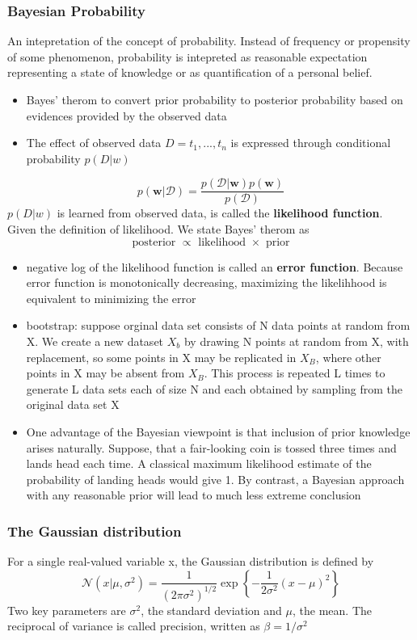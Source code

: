 \documentclass[11pt]{article}
\begin{document}
\subsubsection{Bayesian Probability}
\label{sec:org49c9b30}
An intepretation of the concept of probability. Instead of frequency or propensity of some phenomenon, probability is intepreted as reasonable expectation representing a state of knowledge or as quantification of a personal belief.     
\begin{itemize}
\item Bayes' therom to convert prior probability to posterior probability based on evidences provided by the observed data
\item The effect of observed data \(D = {t_1,..., t_n}\) is expressed through conditional probability \(p(D|w)\)
\end{itemize}
$$
p ( \mathbf { w } | \mathcal { D } ) = \frac { p ( \mathcal { D } | \mathbf { w } ) p ( \mathbf { w } ) } { p ( \mathcal { D } ) }
$$
\(p(D|w)\) is learned from observed data, is called the \textbf{\textbf{likelihood function}}.
Given the definition of likelihood. We state Bayes' therom as 
$$
\text { posterior } \propto \text { likelihood } \times \text { prior }
$$
\begin{itemize}
\item negative log of the likelihood function is called an \textbf{\textbf{error function}}. Because error function is monotonically decreasing, maximizing the likelihhood is equivalent to minimizing the error
\item bootstrap: suppose orginal data set consists of N data points at random from X. We create a new dataset \(X_b\) by drawing N points at random from X, with replacement, so some points in X may be replicated in \(X_B\), where other points in X may be absent from \(X_B\). This process is repeated L times to generate L data sets each of size N and each obtained by sampling from the original data set X
\item One advantage of the Bayesian viewpoint is that inclusion of prior knowledge arises naturally. Suppose, that a fair-looking coin is tossed three times and lands head each time. A classical maximum likelihood estimate of the probability of landing heads would give 1. By contrast, a Bayesian approach with any reasonable prior will lead to much less extreme conclusion
\end{itemize}
\subsubsection{The Gaussian distribution}
\label{sec:org86ce7e6}
For a single real-valued variable x, the Gaussian distribution is defined by 
$$
\mathcal { N } \left( x | \mu , \sigma ^ { 2 } \right) = \frac { 1 } { \left( 2 \pi \sigma ^ { 2 } \right) ^ { 1 / 2 } } \exp \left\{ - \frac { 1 } { 2 \sigma ^ { 2 } } ( x - \mu ) ^ { 2 } \right\}
$$
Two key parameters are \(\sigma^2\), the standard deviation and \(\mu\), the mean. The reciprocal of variance is called precision, written as \(\beta = 1 / \sigma ^ { 2 }\) 
\end{document}
